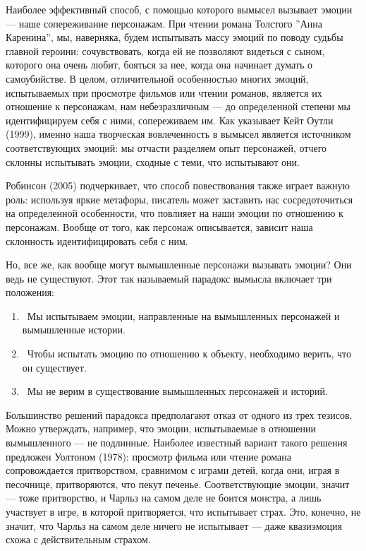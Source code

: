 \documentclass[11pt]{book}
\begin{document}
Наиболее эффективный способ, с помощью которого вымысел вызывает эмоции --- наше сопереживание персонажам. При чтении романа Толстого ''Анна Каренина'', мы, наверняка, будем испытывать массу эмоций по поводу судьбы главной героини: сочувствовать, когда ей не позволяют видеться с сыном, которого она очень любит, бояться за нее, когда она начинает думать о самоубийстве. В целом, отличительной особенностью многих эмоций, испытываемых при просмотре фильмов или чтении романов, является их отношение к персонажам, нам небезразличным --- до определенной степени мы идентифицируем себя с ними, сопереживаем им. Как указывает Кейт Оутли (1999), именно наша творческая вовлеченность в вымысел является источником соответствующих эмоций: мы отчасти разделяем опыт персонажей, отчего склонны испытывать эмоции, сходные с теми, что испытывают они.

Робинсон (2005) подчеркивает, что способ повествования также играет важную роль: используя яркие метафоры, писатель может заставить нас сосредоточиться на определенной особенности, что повлияет на наши эмоции по отношению к персонажам. Вообще от того, как персонаж описывается, зависит наша склонность идентифицировать себя с ним.

Но, все же, как вообще могут вымышленные персонажи вызывать эмоции? Они ведь не существуют. Этот так называемый парадокс вымысла включает три положения:

\begin{enumerate}
  \item\ Мы испытываем эмоции, направленные на вымышленных персонажей и вымышленные истории.
  \item\ Чтобы испытать эмоцию по отношению к объекту, необходимо верить, что он существует.
  \item\ Мы не верим в существование вымышленных персонажей и историй.
\end{enumerate}

Большинство решений парадокса предполагают отказ от одного из трех тезисов. Можно утверждать, например, что эмоции, испытываемые в отношении вымышленного --- не подлинные. Наиболее известный вариант такого решения предложен Уолтоном (1978): просмотр фильма или чтение романа сопровождается притворством, сравнимом с играми детей, когда они, играя в песочнице, притворяются, что пекут печенье. Соответствующие эмоции, значит --- тоже притворство, и Чарльз на самом деле не боится монстра, а лишь участвует в игре, в которой притворяется, что испытывает страх. Это, конечно, не значит, что Чарльз на самом деле ничего не испытывает --- даже квазиэмоция схожа с действительным страхом.
\end{document}
